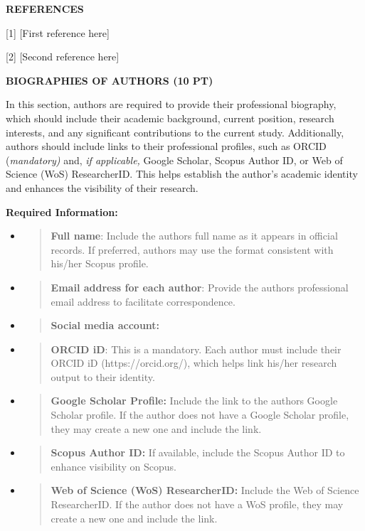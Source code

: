\documentclass[
]{article}
\begin{document}
\textbf{REFERENCES}

{[}1{]} [First reference here]

{[}2{]} [Second reference here]

\textbf{BIOGRAPHIES OF AUTHORS (10 PT)}

In this section, authors are required to provide their professional biography, which should include their academic background, current position, research interests, and any significant contributions to the current study. Additionally, authors should include links to their professional profiles, such as ORCID (\emph{mandatory)} and, \emph{if applicable,} Google Scholar, Scopus Author ID, or Web of Science (WoS) ResearcherID. This helps establish the author's academic identity and enhances the visibility of their research.

\textbf{Required Information:}

\begin{itemize}
\item
  \begin{quote}
  \textbf{Full name}: Include the author\textquotesingle s full name as it appears in official records. If preferred, authors may use the format consistent with his/her Scopus profile.
  \end{quote}
\item
  \begin{quote}
  \textbf{Email address for each author}: Provide the author\textquotesingle s professional email address to facilitate correspondence.
  \end{quote}
\item
  \begin{quote}
  \textbf{Social media account:}
  \end{quote}
\end{itemize}

\begin{itemize}
\item
  \begin{quote}
  \textbf{ORCID iD}: This is a mandatory. Each author must include their ORCID iD (https://orcid.org/), which helps link his/her research output to their identity.
  \end{quote}
\item
  \begin{quote}
  \textbf{Google Scholar Profile:} Include the link to the author\textquotesingle s Google Scholar profile. If the author does not have a Google Scholar profile, they may create a new one and include the link.
  \end{quote}
\item
  \begin{quote}
  \textbf{Scopus Author ID:} If available, include the Scopus Author ID to enhance visibility on Scopus.
  \end{quote}
\item
  \begin{quote}
  \textbf{Web of Science (WoS) ResearcherID:} Include the Web of Science ResearcherID. If the author does not have a WoS profile, they may create a new one and include the link.
  \end{quote}
\end{itemize}
\end{document}
